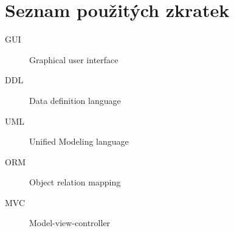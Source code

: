 \documentclass[thesis=B,czech]{FITthesis}[2012/06/26]
\begin{document}



\appendix

\chapter{Seznam použitých zkratek}
\begin{description}
	\item[GUI] Graphical user interface
	\item[DDL] Data definition language
	\item[UML] Unified Modeling language
	\item[ORM] Object relation mapping
	\item[MVC] Model-view-controller
\end{description}
\end{document}
